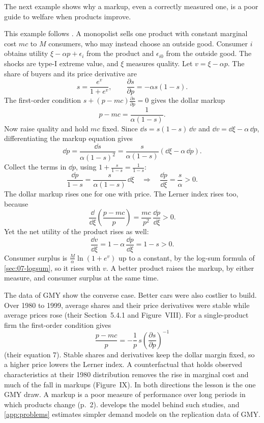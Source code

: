 The next example shows why a markup, even a correctly measured one, is a poor guide to welfare when products
improve.

\begin{example}\label{ex:01-quality-markup}
This example follows \citet[p.~26, n.~13]{GriecoMurryYurukoglu2024}. A monopolist sells one product with constant
marginal cost $mc$ to $M$ consumers, who may instead choose an outside good. Consumer $i$ obtains utility
$\xi - \alpha p + \epsilon_{i}$ from the product and $\epsilon_{i0}$ from the outside good. The shocks are type-I
extreme value, and $\xi$ measures quality. Let $v = \xi - \alpha p$. The share of buyers and its price derivative
are
\[
  s = \frac{e^{v}}{1 + e^{v}}, \qquad \frac{\partial s}{\partial p} = -\alpha s (1 - s).
\]
The first-order condition $s + (p - mc)\frac{\partial s}{\partial p} = 0$ gives the dollar markup
\[
  p - mc = \frac{1}{\alpha (1 - s)} .
\]
Now raise quality and hold $mc$ fixed. Since $\dd s = s(1 - s)\,\dd v$ and $\dd v = \dd\xi - \alpha\,\dd p$,
differentiating the markup equation gives
\[
  \dd p = \frac{\dd s}{\alpha (1 - s)^2} = \frac{s}{\alpha (1 - s)}\left(\dd\xi - \alpha\,\dd p\right).
\]
Collect the terms in $\dd p$, using $1 + \frac{s}{1 - s} = \frac{1}{1 - s}$:
\[
  \frac{\dd p}{1 - s} = \frac{s}{\alpha (1 - s)}\,\dd\xi
  \quad\Longrightarrow\quad
  \frac{\dd p}{\dd \xi} = \frac{s}{\alpha} > 0 .
\]
The dollar markup rises one for one with price. The Lerner index rises too, because
\[
  \frac{\dd}{\dd \xi}\left(\frac{p - mc}{p}\right) = \frac{mc}{p^2}\,\frac{\dd p}{\dd \xi} > 0 .
\]
Yet the net utility of the product rises as well:
\[
  \frac{\dd v}{\dd \xi} = 1 - \alpha\,\frac{\dd p}{\dd \xi} = 1 - s > 0 .
\]
Consumer surplus is $\frac{M}{\alpha}\ln(1 + e^{v})$ up to a constant, by the log-sum formula of
\cref{sec:07-logsum}, so it rises with $v$. A better product raises the markup, by either measure, and consumer
surplus at the same time.
\end{example}

The data of GMY show the converse case. Better cars were also costlier to build. Over 1980 to 1999, average shares
and their price derivatives were stable while average prices rose (their Section~5.4.1 and Figure~VIII). For a
single-product firm the first-order condition gives
\[
  \frac{p - mc}{p} = -\frac{1}{p}\, s \left(\frac{\partial s}{\partial p}\right)^{-1}
\]
(their equation 7). Stable shares and derivatives keep the dollar margin fixed, so a higher price lowers the Lerner
index. A counterfactual that holds observed characteristics at their 1980 distribution removes the rise in
marginal cost and much of the fall in markups (Figure~IX). In both directions the lesson is the one GMY draw. A
markup is a poor measure of performance over long periods in which products change (p.~2).  develops
the model behind such studies, and \cref{app:problems} estimates simpler demand models on the replication data of
GMY.


